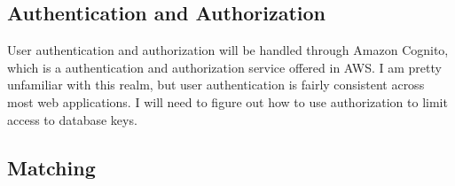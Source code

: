 \documentclass[12pt]{article}
\begin{document}
\subsection*{Authentication and Authorization}

User authentication and authorization will be handled through Amazon Cognito, which is a authentication and authorization service offered in AWS. I am pretty unfamiliar with this realm, but user authentication is fairly consistent across most web applications. I will need to figure out how to use authorization to limit access to database keys.

\subsection*{Matching}
\end{document}
